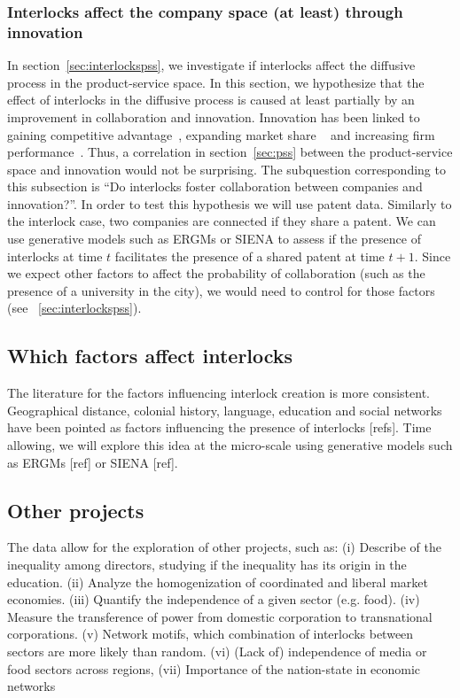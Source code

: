 \subsubsection{Interlocks affect the company space (at least) through innovation}
In section~\ref{sec:interlockspss}, we investigate if interlocks affect the diffusive process in the product-service space.
In this section, we hypothesize that the effect of interlocks in the diffusive process is caused at least partially by an improvement in collaboration and innovation.
Innovation has been linked to gaining competitive advantage~\citep{Hitt1996}, expanding market share ~\citep{Franko1989} and increasing firm performance~\citep{Morbey1988}.
Thus, a correlation in section~\ref{sec:pss} between the product-service space and innovation would not be surprising. 
The subquestion corresponding to this subsection is ``Do interlocks foster collaboration between companies and innovation?''.
In order to test this hypothesis we will use patent data.
Similarly to the interlock case, two companies are connected if they share a patent.
We can use generative models such as ERGMs or SIENA to assess if the presence of interlocks at time $t$ facilitates the presence of a shared patent at time $t+1$. 
Since we expect other factors to affect the probability of collaboration (such as the presence of a university in the city),
we would need to control for those factors (see ~\ref{sec:interlockspss}).


\subsection{Which factors affect interlocks}
\label{sec:factors}
The literature for the factors influencing interlock creation is more consistent.
Geographical distance, colonial history, language, education and social networks have been pointed as factors influencing the presence of interlocks [refs].
Time allowing, we will explore this idea at the micro-scale using generative models such as ERGMs [ref] or SIENA [ref].


\subsection{Other projects}
The data allow for the exploration of other projects, such as:
(i) Describe of the inequality among directors, studying if the inequality has its origin in the education.
(ii) Analyze the homogenization of coordinated and liberal market economies.
(iii) Quantify the independence of a given sector (e.g. food).
(iv) Measure the transference of power from domestic corporation to transnational corporations.
(v) Network motifs, which combination of interlocks between sectors are more likely than random.
(vi) (Lack of) independence of media or food sectors across regions,
(vii) Importance of the nation-state in economic networks